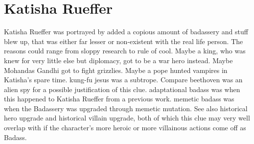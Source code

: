 \documentclass[12pt]{book}
\begin{document}
\chapter{Katisha Rueffer}

Katisha Rueffer was portrayed by added a copious amount of badassery and stuff blew up, that was either far lesser or non-existent with the real life person. The reasons could range from sloppy research to rule of cool. Maybe a king, who was knew for very little else but diplomacy, got to be a war hero instead. Maybe Mohandas Gandhi got to fight grizzlies. Maybe a pope hunted vampires in Katisha's spare time. kung-fu jesus was a subtrope. Compare beethoven was an alien spy for a possible justification of this clue. adaptational badass was when this happened to Katisha Rueffer from a previous work. memetic badass was when the Badassery was upgraded through memetic mutation. See also historical hero upgrade and historical villain upgrade, both of which this clue may very well overlap with if the character's more heroic or more villainous actions come off as Badass.
\end{document}
